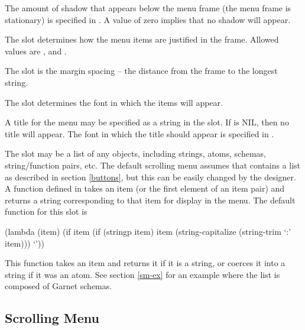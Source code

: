 The amount of shadow that appears below the menu frame (the menu frame
is stationary) is specified in .  A value of zero
implies that no shadow will appear.

The slot  determines how the menu items are justified in
the frame.  Allowed values are ,  and
.

The slot  is the margin spacing -- the distance from
the frame to the longest string.

The slot  determines the font in which the items will
appear.

A title for the menu may be specified as a string in the 
slot.  If  is NIL, then no title will appear.  The font in
which the title should appear is specified in .


 The  slot may be a list of
any objects, including strings, atoms, schemas, string/function pairs,
etc.  The default scrolling menu assumes that  contains a
list as described in section \ref{buttons}, but this can be easily
changed by the designer.  A function defined in
 takes an item (or the first element of
an item pair) and returns a string corresponding to that item for
display in the menu.  The default function for this slot is

\begin{programexample}
(lambda (item)
  (if item
      (if (stringp item)
	  item
	  (string-capitalize (string-trim `:' item)))
      `'))
\end{programexample}

This function takes an item and returns it if it is a string, or
coerces it into a string if it was an atom.  See section \ref{sm-ex}
for an example where the  list is composed of Garnet
schemas.

\begin{group}
\section{Scrolling Menu}
\label{scrolling-menu}
\begin{center}
\end{center}
\end{group}

